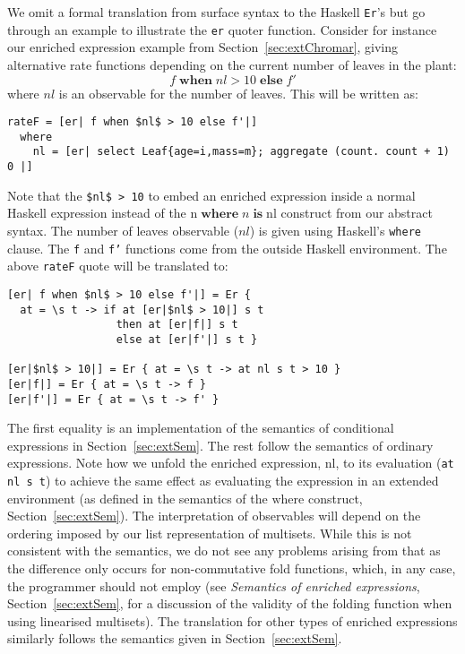 \documentclass[phd]{infthesis}
\newcommand{\s}[1]{\underline{#1}}
\begin{document}
We omit a formal translation from surface syntax to the Haskell \texttt{Er}'s
but go through an example to illustrate the \texttt{er} quoter
function. Consider for instance our enriched expression example from
Section~\ref{sec:extChromar}, giving alternative rate functions depending on the
current number of leaves in the plant:
$$
f \; \mathbf{when} \; nl  > 10 \; \mathbf{else} \; f'
$$
where $nl$ is an observable for the number of leaves. This will be written as:
\begin{center}
\begin{BVerbatim}
rateF = [er| f when $nl$ > 10 else f'|]
  where
    nl = [er| select Leaf{age=i,mass=m}; aggregate (count. count + 1) 0 |]
\end{BVerbatim}
\end{center}
Note that the \texttt{\$nl\$ > 10} to embed an enriched expression inside a
normal Haskell expression instead of the
$\mathrm{n} \; \mathbf{where} \; n \; \mathbf{is} \; \mathrm{nl}$ construct from
our abstract syntax. The number of leaves observable ($nl$) is given using
Haskell's \texttt{where} clause. The \texttt{f} and \texttt{f'} functions come
from the outside Haskell environment. The above \texttt{rateF} quote will be
translated to:
\begin{center}
\begin{BVerbatim}
[er| f when $nl$ > 10 else f'|] = Er {
  at = \s t -> if at [er|$nl$ > 10|] s t
                 then at [er|f|] s t
                 else at [er|f'|] s t }
               
[er|$nl$ > 10|] = Er { at = \s t -> at nl s t > 10 }
[er|f|] = Er { at = \s t -> f }
[er|f'|] = Er { at = \s t -> f' }
\end{BVerbatim}
\end{center}
The first equality is an implementation of the semantics of conditional
expressions in Section~\ref{sec:extSem}.  The rest follow the semantics of
ordinary expressions.  Note how we unfold the enriched expression,
$\mathrm{nl}$, to its evaluation (\texttt{at nl s t}) to achieve the same effect
as evaluating the expression in an extended environment (as defined in the
semantics of the $\mathrm{where}$ construct, Section~\ref{sec:extSem}).  The
interpretation of observables will depend on the ordering imposed by our list
representation of multisets.  While this is not consistent with the semantics,
we do not see any problems arising from that as the difference only occurs for
non-commutative fold functions, which, in any case, the programmer should not
employ (see \textit{Semantics of enriched expressions},
Section~\ref{sec:extSem}, for a discussion of the validity of the folding
function when using linearised multisets).  The translation for other types of
enriched expressions similarly follows the semantics given in
Section~\ref{sec:extSem}.


\singlespace


\printbibliography[heading=bibintoc]

\end{document}
